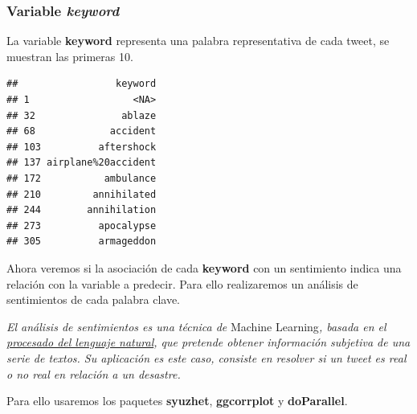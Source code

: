 \documentclass[
]{article}
\newenvironment{Shaded}{\begin{snugshade}}{\end{snugshade}}
\newcommand{\DecValTok}[1]{\textcolor[rgb]{0.00,0.00,0.81}{#1}}
\newcommand{\KeywordTok}[1]{\textcolor[rgb]{0.13,0.29,0.53}{\textbf{#1}}}
\newcommand{\NormalTok}[1]{#1}
\newcommand{\OperatorTok}[1]{\textcolor[rgb]{0.81,0.36,0.00}{\textbf{#1}}}
\newcommand{\StringTok}[1]{\textcolor[rgb]{0.31,0.60,0.02}{#1}}
\begin{document}
\hypertarget{variable-keyword}{%
\subsubsection{\texorpdfstring{Variable
\emph{keyword}}{Variable keyword}}\label{variable-keyword}}

La variable \textbf{keyword} representa una palabra representativa de
cada tweet, se muestran las primeras 10.

\begin{Shaded}
\end{Shaded}

\begin{verbatim}
##                 keyword
## 1                  <NA>
## 32               ablaze
## 68             accident
## 103          aftershock
## 137 airplane%20accident
## 172           ambulance
## 210         annihilated
## 244        annihilation
## 273          apocalypse
## 305          armageddon
\end{verbatim}

Ahora veremos si la asociación de cada \textbf{keyword} con un
sentimiento indica una relación con la variable a predecir. Para ello
realizaremos un análisis de sentimientos de cada palabra clave.

\emph{El análisis de sentimientos es una técnica de }Machine
Learning\emph{, basada en el
\href{https://www.kdnuggets.com/2017/02/natural-language-processing-key-terms-explained.html}{procesado
del lenguaje natural}, que pretende obtener información subjetiva de una
serie de textos. Su aplicación es este caso, consiste en resolver si un
tweet es real o no real en relación a un desastre.}

Para ello usaremos los paquetes \textbf{syuzhet}, \textbf{ggcorrplot} y
\textbf{doParallel}.
\end{document}
